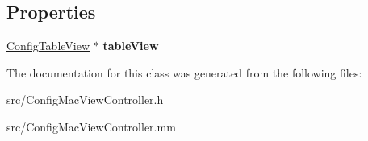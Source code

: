 \subsection*{Properties}
\begin{DoxyCompactItemize}
\item 
\mbox{\label{interfaceConfigViewController_a70244832aa26bf33937bba95badc35ae}} 
\hyperlink{interfaceConfigTableView}{Config\+Table\+View} $\ast$ {\bfseries table\+View}
\end{DoxyCompactItemize}


The documentation for this class was generated from the following files\+:\begin{DoxyCompactItemize}
\item 
src/Config\+Mac\+View\+Controller.\+h\item 
src/Config\+Mac\+View\+Controller.\+mm\end{DoxyCompactItemize}

